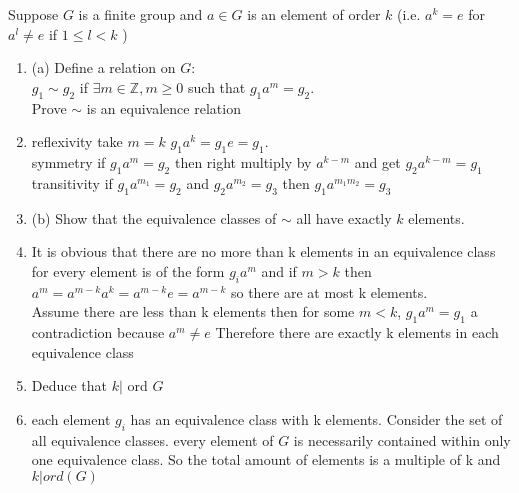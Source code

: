 \documentclass{article}
\begin{document}
    \section{}
    Suppose $G$ is a finite group and $a \in G$ is an element of order $k$ (i.e. $a^{k}=e$ for $a^{l} \ne e$ if  $1 \le l < k$ )
    \begin{enumerate}
        \item (a) Define a relation on $G $:\\
            $g_1 \sim g_2$ if $\exists m \in \mathbb{Z}, m \ge 0 $ such that $g_1a^{m} = g_2$.\\
            Prove $\sim$ is an equivalence relation
        \item
            reflexivity take $m=k$ $g_1a^{k} = g_1e = g_1$.\\
            symmetry if $g_1a^{m} = g_2$ then right multiply by $a^{k-m}$ and get $g_2a^{k-m} = g_1$\\
            transitivity if $g_1a^{m_1} = g_2$ and $g_2a^{m_2} = g_3$ then $g_1a^{m_1m_2} = g_3$
        \item (b) Show that the equivalence classes of $\sim$ all have exactly $k$ elements.
            \item
            It is obvious that there are no more than k elements in an equivalence class for every element is of the form
            $g_{i}a^{m}$ and if $m > k$ then $a^{m} = a^{m-k}a^{k} = a^{m-k}e = a^{m-k}$ so there are at most k elements.\\
            Assume there are less than k elements then for some $m < k$, $g_1a^{m} = g_1$ a contradiction because $a^{m} \ne e$
            Therefore there are exactly k elements in each equivalence class
        \item Deduce that $k | $ ord $G$
            \item
            each element $g_i$ has an equivalence class with k elements. Consider the set of all equivalence classes. 
            every element of $G$ is necessarily contained within only one equivalence class. So the total amount of elements is a multiple of k and $k|ord(G)$
    \end{enumerate}
\end{document}
